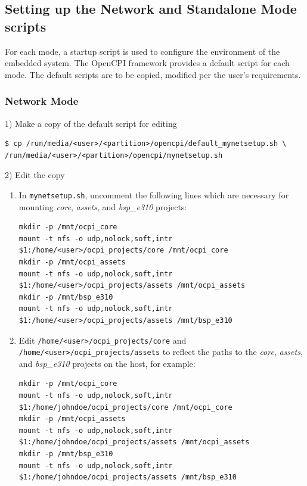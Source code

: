 \begin{flushleft}

\subsection{Setting up the Network and Standalone Mode scripts}

For each mode, a startup script is used to configure the environment of the embedded system. The OpenCPI framework provides a default script for each mode. The default scripts are to be copied, modified per the user's requirements.\par\medskip

\subsubsection{Network Mode}
1) Make a copy of the default script for editing
\begin{verbatim}
$ cp /run/media/<user>/<partition>/opencpi/default_mynetsetup.sh \
/run/media/<user>/<partition>/opencpi/mynetsetup.sh
\end{verbatim}\medskip

2) Edit the copy
\begin{enumerate}
\item In \texttt{mynetsetup.sh}, uncomment the following lines which are necessary for mounting \textit{core}, \textit{assets}, and \textit{bsp\_e310} projects:

\begin{verbatim}
mkdir -p /mnt/ocpi_core
mount -t nfs -o udp,nolock,soft,intr $1:/home/<user>/ocpi_projects/core /mnt/ocpi_core
mkdir -p /mnt/ocpi_assets
mount -t nfs -o udp,nolock,soft,intr $1:/home/<user>/ocpi_projects/assets /mnt/ocpi_assets
mkdir -p /mnt/bsp_e310
mount -t nfs -o udp,nolock,soft,intr $1:/home/<user>/ocpi_projects/assets /mnt/bsp_e310
\end{verbatim}
 \item Edit \texttt{/home/<user>/ocpi\_projects/core} and \texttt{/home/<user>/ocpi\_projects/assets} to reflect the paths to the \textit{core}, \textit{assets}, and \textit{bsp\_e310} projects on the host, for example:
\begin{verbatim}
mkdir -p /mnt/ocpi_core
mount -t nfs -o udp,nolock,soft,intr $1:/home/johndoe/ocpi_projects/core /mnt/ocpi_core
mkdir -p /mnt/ocpi_assets
mount -t nfs -o udp,nolock,soft,intr $1:/home/johndoe/ocpi_projects/assets /mnt/ocpi_assets
mkdir -p /mnt/bsp_e310
mount -t nfs -o udp,nolock,soft,intr $1:/home/johndoe/ocpi_projects/assets /mnt/bsp_e310
\end{verbatim}
\end{enumerate}


\end{flushleft}
